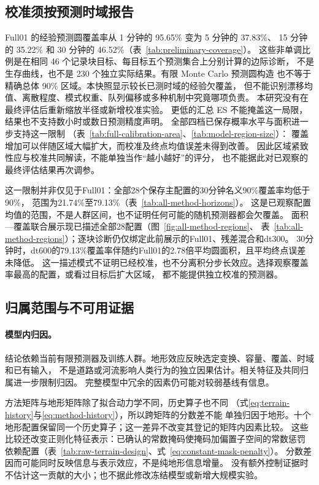 \documentclass[UTF8,11pt]{ctexart}
\begin{document}
\subsection{校准须按预测时域报告}
\label{sec:discussion-calibration}
Full01 的经验预测圆覆盖率从 1 分钟的 95.65\% 变为 5 分钟的 37.83\%、
15 分钟的 35.22\% 和 30 分钟的 46.52\%（表~\ref{tab:preliminary-coverage}）。
这些非单调比例是在相同 46 个记录块目标、每目标五个预测集合上分别计算的边际诊断，
不是生存曲线，也不是 230 个独立实际结果。有限 Monte Carlo 预测圆构造
也不等于精确总体 90\% 区域。本快照显示较长已测时域的经验欠覆盖，
但不能识别漂移均值、离散程度、模式权重、队列偏移或多种机制中究竟哪项负责。
本研究没有在最终评估后重新缩放半径或新增校准实验。
更低的汇总 ES 不能掩盖这一局限，结果也不支持数小时或数日预测精度声明。
全部四档已保存概率水平与面积进一步支持这一限制
（表~\ref{tab:full-calibration-area}、\ref{tab:model-region-size}）：
覆盖增加可以伴随区域大幅扩大，而校准及终点均值误差未得到改善。
因此区域紧致性应与校准共同解读，不能单独当作“越小越好”的评分，
也不能据此对已观察的最终评估结果再次调参。

这一限制并非仅见于Full01：全部28个保存主配置的30分钟名义90\%覆盖率均低于90\%，
范围为21.74\%至79.13\%（表~\ref{tab:all-method-horizons}）。
这是已观察配置均值的范围，不是人群区间，也不证明任何可能的随机预测器都会欠覆盖。
面积—覆盖联合展示现已描述全部28配置（图~\ref{fig:all-method-regions}、
表~\ref{tab:all-method-regions}）；逐块诊断仍仅绑定此前展示的Full01、残差混合和dt300。
30分钟时，dt600的79.13\%覆盖率伴随约Full01的2.78倍平均圆面积，且平均终点误差未降低。
这一描述模式不证明已经校准，也不分离积分步长效应。选择观察覆盖率最高的配置，或看过目标后扩大区域，
都不能提供独立校准的预测器。

\subsection{归属范围与不可用证据}
\label{sec:discussion-scope}
\paragraph{模型内归因。}
结论依赖当前有限预测器及训练人群。地形效应反映选定变换、容量、覆盖、时域和已有输入，
不是道路或河流影响人类行为的独立因果估计。相关特征及共同归属进一步限制归因。
完整模型中冗余的因素仍可能对较弱基线有信息。

方法矩阵与地形矩阵除了拟合动力学不同，历史算子也不同
（式\eqref{eq:terrain-history}与\eqref{eq:method-history}），所以跨矩阵的分数差不能
单独归因于地形。十个地形配置保留同一个历史算子；这一差异不改变其登记的矩阵内因素比较。
这些比较还改变正则化特征表示：已确认的常数掩码使掩码加偏置子空间的常数惩罚
依赖配置（表~\ref{tab:raw-terrain-design}、式~\eqref{eq:constant-mask-penalty}）。
分数差因而可能同时反映信息与表示效应，不是纯地形信息增量。
没有额外控制证据时不估计这一贡献的大小；也不据此修改冻结模型或新增大规模实验。
\end{document}
